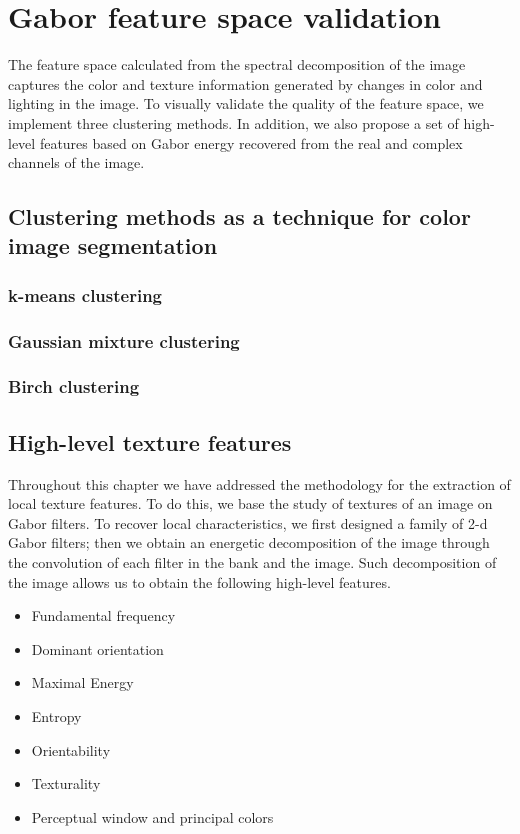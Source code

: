 \section{Gabor feature space validation}
The feature space calculated from the spectral decomposition of the image captures the color and texture information generated by changes in color and lighting in the image. To visually validate the quality of the feature space, we implement three clustering methods. In addition, we also propose a set of high-level features based on Gabor energy recovered from the real and complex channels of the image.

\subsection{Clustering methods as a technique for color image segmentation}


\subsubsection{k-means clustering}
\subsubsection{Gaussian mixture clustering}
\subsubsection{Birch clustering}


\subsection{High-level texture features}
Throughout this chapter we have addressed the methodology for the extraction of local texture features. To do this, we base the study of textures of an image on Gabor filters. To recover local characteristics, we first designed a family of 2-d Gabor filters; then we obtain an energetic decomposition of the image through the convolution of each filter in the bank and the image. Such decomposition of the image allows us to obtain the following high-level features.

\begin{itemize}
	\item Fundamental frequency
	\item Dominant orientation
	\item Maximal Energy
	\item Entropy
	\item Orientability
	\item Texturality 
	\item Perceptual window and principal colors
\end{itemize}

